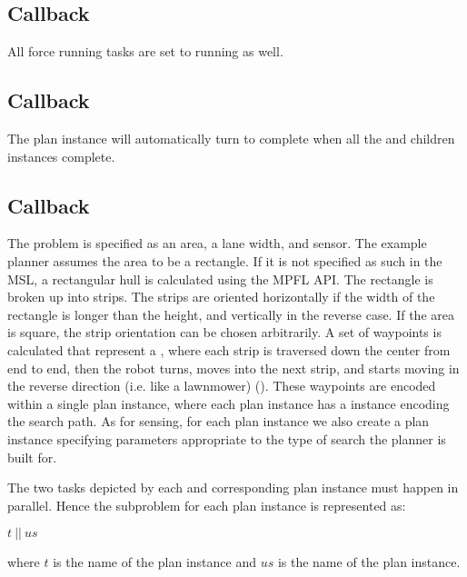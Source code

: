 \subsection{Callback }
All force running tasks are set to running as well.

\subsection{Callback }
The plan instance will automatically turn to complete when all the  and  children instances complete.

\subsection{Callback }
The  problem is specified as an area, a lane width, and sensor. The example planner assumes the area to be a rectangle. If it is not specified as such in the MSL, a rectangular hull is calculated using the MPFL API. The rectangle is broken up into strips. The strips are oriented horizontally if the width of the rectangle is longer than the height, and vertically in the reverse case. If the area is square, the strip orientation can be chosen arbitrarily. A set of waypoints is calculated that represent a , where each strip is traversed down the center from end to end, then the robot turns, moves into the next strip, and starts moving in the reverse direction (i.e. like a lawnmower) (). These waypoints are encoded within a single  plan instance, where each  plan instance has a  instance encoding the search path. As for sensing, for each  plan instance we also create a  plan instance specifying parameters appropriate to the type of search the planner is built for.


The two tasks depicted by each  and corresponding  plan instance must happen in parallel. Hence the subproblem for each  plan instance is represented as:
\begin{center}
$t ~ || ~ us$
\end{center}
where $t$ is the name of the  plan instance and $us$ is the name of the  plan instance.

